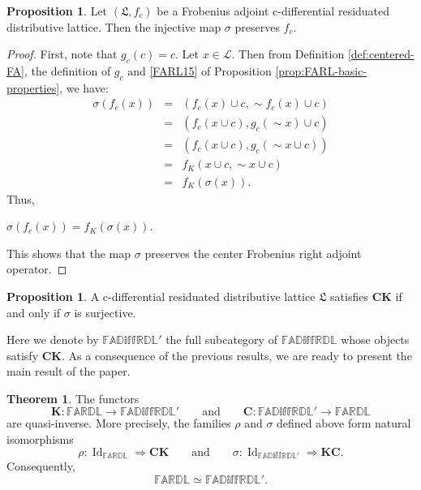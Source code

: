 \documentclass[final,12pt,times]{elsarticle}
\theoremstyle{plain}
\theoremstyle{definition}
\newtheorem{theorem}[definition]{Theorem}
\newtheorem{proposition}[definition]{Proposition}
\theoremstyle{break}
\begin{document}
\begin{proposition}\label{proposition5.13} Let $(\boldsymbol{\mathfrak{L}},f_c)$ be a Frobenius adjoint c-differential residuated distributive lattice. Then the injective map $\sigma$ preserves $f_c$.
\end{proposition}
\begin{proof}
First, note that $g_c(c) = c$. Let $x \in \mathcal{L}$. Then from Definition \ref{def:centered-FA}, the definition of $g_c$ and \ref{FARL15} of Proposition \ref{prop:FARL-basic-properties}, we have:
\begin{eqnarray*}
\sigma(f_c(x)) &=& (f_c(x) \cup c, \sim f_c (x) \cup c) \\
&=& (f_c (x \cup c), g_c(\sim x) \cup c) \\
&=& (f_c(x \cup c), g_c(\sim x \cup c)) \\
&=& f_K(x \cup c, \sim x \cup c) \\
&=& f_K(\sigma(x)).
\end{eqnarray*}
Thus,
\begin{center}
$\sigma(f_c(x)) = f_K(\sigma(x))$.
\end{center}
This shows that the map $\sigma$ preserves the center Frobenius right adjoint operator.
\end{proof}


\begin{proposition}\label{proposition5.14}\cite{Castiglionib}  A c-differential residuated distributive lattice $\boldsymbol{\mathfrak{L}}$ satisfies $\mathbf{CK}$ if and only if $\sigma$ is surjective.
\end{proposition}

Here we denote by $\mathbb{FAD\text{iff}RDL'}$ the full subcategory of $\mathbb{FAD\text{iff}RDL}$ whose objects satisfy $\mathbf{CK}$. As a consequence of the previous results, we are ready to present the main result of the paper.
\begin{theorem}\label{theorem5.15}
The functors
\[
\mathbf{K}:\mathbb{FARDL}\longrightarrow\mathbb{FAD\text{iff}RDL'}
\qquad\text{and}\qquad
\mathbf{C}:\mathbb{FAD\text{iff}RDL'}\longrightarrow\mathbb{FARDL}
\]
are quasi-inverse. More precisely, the families $\rho$ and $\sigma$ defined above form natural isomorphisms
\[
\rho:\operatorname{Id}_{\mathbb{FARDL}}
   \Longrightarrow \mathbf{C}\mathbf{K}
\qquad\text{and}\qquad
\sigma:\operatorname{Id}_{\mathbb{FAD\text{iff}RDL'}}
   \Longrightarrow \mathbf{K}\mathbf{C}.
\]
Consequently,
\[
\mathbb{FARDL}\simeq\mathbb{FAD\text{iff}RDL'}.
\]
\end{theorem}
\end{document}
